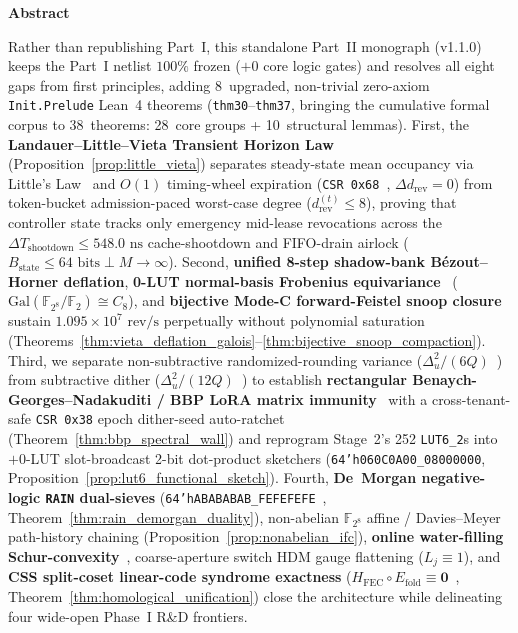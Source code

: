 \documentclass[10pt,twocolumn]{article}
\renewenvironment{abstract}{%
  \par\vspace{2pt}%
  \begin{center}%
  \begin{minipage}{0.95\textwidth}%
  \noindent{\color{black!55}\hrule height 0.4pt}\vspace{4pt}%
  \centerline{\bfseries\small Abstract}\vspace{3pt}%
  \fontsize{9.0}{11.0}\selectfont
  \setlength{\parskip}{0.36\baselineskip}%
  \setlength{\parindent}{0pt}%
}{%
  \par\vspace{4pt}\noindent{\color{black!55}\hrule height 0.4pt}%
  \end{minipage}%
  \end{center}%
  \vspace{2pt}%
}
\providecommand{\ReleaseVersion}{v1.1.0}
\providecommand{\LeanNewExpansion}{8}
\providecommand{\LeanCumulativeTotal}{38}
\providecommand{\LeanCoreGroups}{28}
\providecommand{\LeanStructuralLemmas}{10}
\theoremstyle{spectralthm}
\begin{document}
\begin{abstract}
Rather than republishing Part~I, this standalone Part~II monograph (\ReleaseVersion) keeps the Part~I netlist $100\%$ frozen ($+0$ core logic gates) and resolves all eight gaps from first principles, adding \LeanNewExpansion\ upgraded, non-trivial zero-axiom \texttt{Init.Prelude} Lean~4 theorems (\texttt{thm30}--\texttt{thm37}, bringing the cumulative formal corpus to \LeanCumulativeTotal\ theorems: \LeanCoreGroups\ core groups + \LeanStructuralLemmas\ structural lemmas). First, the \textbf{Landauer--Little--Vieta Transient Horizon Law} (Proposition~\ref{prop:little_vieta}) separates steady-state mean occupancy via Little's Law~\cite{little1961proof} and $O(1)$ timing-wheel expiration (\texttt{CSR 0x68}~\cite{varghese1997timing}, $\Delta d_{\mathrm{rev}}=0$) from token-bucket admission-paced worst-case degree ($d_{\mathrm{rev}}^{(t)} \le 8$), proving that controller state tracks only emergency mid-lease revocations across the $\Delta T_{\mathrm{shootdown}} \le 548.0\text{~ns}$ cache-shootdown and FIFO-drain airlock ($B_{\mathrm{state}} \le 64\text{~bits} \perp M \to \infty$). Second, \textbf{unified 8-step shadow-bank B\'{e}zout--Horner deflation}, \textbf{0-LUT normal-basis Frobenius equivariance}~\cite{mullin1989optimal,diamond2025binius} ($\mathrm{Gal}(\mathbb{F}_{2^8}/\mathbb{F}_2) \cong C_8$), and \textbf{bijective Mode-C forward-Feistel snoop closure} sustain $1.095 \times 10^7\text{~rev/s}$ perpetually without polynomial saturation (Theorems~\ref{thm:vieta_deflation_galois}--\ref{thm:bijective_snoop_compaction}). Third, we separate non-subtractive randomized-rounding variance ($\Delta_u^2/(6Q)$~\cite{wannamaker2000nonsubtractive}) from subtractive dither ($\Delta_u^2/(12Q)$~\cite{schuchman1964dither,gray1993dithered}) to establish \textbf{rectangular Benaych-Georges--Nadakuditi / BBP LoRA matrix immunity}~\cite{baik2005phase,benaych2012singular,gavish2014optimal} with a cross-tenant-safe \texttt{CSR 0x38} epoch dither-seed auto-ratchet (Theorem~\ref{thm:bbp_spectral_wall}) and reprogram Stage~2's 252 \mbox{\texttt{LUT6\_2}}s into $+0$-LUT slot-broadcast 2-bit dot-product sketchers (\texttt{64'h060C0A00\_08000000}, Proposition~\ref{prop:lut6_functional_sketch}). Fourth, \textbf{De~Morgan negative-logic \texttt{RAIN} dual-sieves} (\texttt{64'hABABABAB\_FEFEFEFE}~\cite{mitra2000commonmode}, Theorem~\ref{thm:rain_demorgan_duality}), non-abelian $\mathbb{F}_{2^8}$ affine / Davies--Meyer path-history chaining (Proposition~\ref{prop:nonabelian_ifc}), \textbf{online water-filling Schur-convexity}~\cite{marshall2011inequalities}, coarse-aperture switch HDM gauge flattening ($L_j \equiv 1$), and \textbf{CSS split-coset linear-code syndrome exactness} ($H_{\mathrm{FEC}} \circ E_{\mathrm{fold}} \equiv \mathbf{0}$~\cite{calderbank1996good}, Theorem~\ref{thm:homological_unification}) close the architecture while delineating four wide-open Phase~I R\&D frontiers.
\end{abstract}
\end{document}

